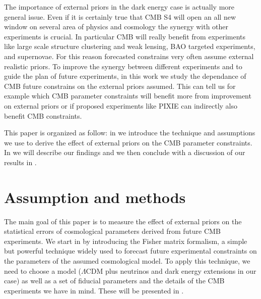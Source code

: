 \documentclass[aps,prd,preprint,groupedaddress]{revtex4-1}
\begin{document}
The importance of external priors in the dark energy case is actually more general issue. Even if it is certainly true that CMB S4 will open an all new window on several area of physics and cosmology the synergy with other experiments is crucial. In particular CMB will really benefit from experiments like large scale structure clustering and weak lensing, BAO targeted experiments, and supernovae. 
For this reason forecasted constrains very often assume external realistic priors. To improve the synergy between different experiments and to guide the plan of future experiments, in this work we study the dependance of CMB future constrains on the external priors assumed.
This can tell us for example which CMB parameter constraints will benefit more from improvement on external priors or if proposed experiments like PIXIE \cite{2011JCAP...07..025K} can indirectly also benefit CMB constraints. 

This paper is organized as follow: in  we introduce the technique and assumptions we use to derive the effect of external priors on the CMB parameter constraints. In  we will describe our findings and we then conclude with a discussion of our results in .



\section{Assumption and methods \label{sec:methods}}
The main goal of this paper is to measure the effect of external priors on the statistical errors of cosmological parameters derived from future CMB experiments.
We start in  by introducing the Fisher matrix formalism, a simple but powerful technique widely used to forecast future experimental constraints on the parameters of the assumed cosmological model. To apply this technique, we need to choose a model ($\Lambda$CDM plus neutrinos and dark energy extensions in our case) as well as a set of fiducial parameters and the details of the CMB experiments we have in mind. These will be presented in .
\end{document}
